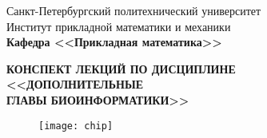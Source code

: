 \documentclass[main.tex]{subfiles}
\begin{document}
\begin{titlepage}
\begin{center}
	\begin{large}
		Санкт-Петербургский политехнический университет\\
		Институт прикладной математики и механики\\
		\textbf{Кафедра <<Прикладная математика>>}\\
	\end{large}
	\vfill
	\Large{\textbf{КОНСПЕКТ ЛЕКЦИЙ ПО ДИСЦИПЛИНЕ \\
			 <<ДОПОЛНИТЕЛЬНЫЕ \\
			 ГЛАВЫ БИОИНФОРМАТИКИ>>}}
\end{center}
\vfill
\begin{figure}[H]
	\centering \texttt{[image: chip]}
\end{figure}
\vfill
{}
\end{titlepage}
\end{document}

